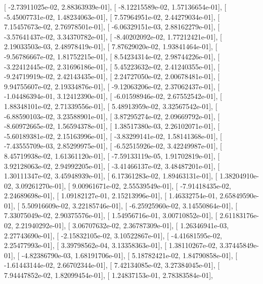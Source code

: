\documentclass{article}
\begin{document}
       [ -2.73911025e-02,   2.88363939e-01],
       [ -8.12215589e-02,   1.57136654e-01],
       [ -5.45007731e-02,   1.48234063e-01],
       [  7.57964951e-02,   2.44279034e-01],
       [  7.15457673e-02,   2.76978501e-01],
       [ -6.06329151e-03,   2.88162279e-01],
       [ -3.57641437e-02,   3.34370782e-01],
       [ -8.40202092e-02,   1.77212421e-01],
       [  2.19033503e-03,   2.48978419e-01],
       [  7.87629020e-02,   1.93841464e-01],
       [ -9.56786667e-02,   1.81752215e-01],
       [  8.54234314e-02,   2.98744226e-01],
       [ -3.22412445e-02,   2.31696186e-01],
       [  5.45223632e-02,   2.41240355e-01],
       [ -9.24719919e-02,   2.42143435e-01],
       [  2.24727050e-02,   2.00678481e-01],
       [  9.94755607e-02,   2.19334876e-01],
       [ -9.12063206e-02,   2.37062437e-01],
       [ -1.04486394e-01,   3.12412390e-01],
       [ -6.01598946e-02,   2.67552542e-01],
       [  1.88348101e-02,   2.71339556e-01],
       [  5.48913959e-02,   3.32567542e-01],
       [ -6.88590103e-02,   3.23588901e-01],
       [  3.87295274e-02,   2.09669792e-01],
       [ -8.60972665e-02,   1.56594378e-01],
       [  1.38517380e-03,   2.26102071e-01],
       [ -5.60189381e-02,   2.15163996e-01],
       [ -3.83299141e-02,   1.58141368e-01],
       [ -7.43555709e-03,   2.85299975e-01],
       [ -6.52515926e-02,   3.42249987e-01],
       [  8.45719938e-02,   1.61361120e-01],
       [ -7.59133119e-05,   1.91702819e-01],
       [  3.92128063e-02,   2.94992205e-01],
       [ -3.41466137e-02,   3.48487201e-01],
       [  1.30111347e-02,   3.45948939e-01],
       [  6.17361283e-02,   1.89463131e-01],
       [  1.38204910e-02,   3.09261270e-01],
       [  9.00961671e-02,   2.55539549e-01],
       [ -7.91418435e-02,   2.24689698e-01],
       [  1.09182127e-01,   2.15213996e-01],
       [  1.46332754e-01,   2.65849590e-01],
       [  5.50916609e-02,   3.22185746e-01],
       [ -6.25925960e-02,   3.14550864e-01],
       [  7.33075049e-02,   2.90375576e-01],
       [  1.54956716e-01,   3.00710852e-01],
       [  2.61183176e-02,   2.21940292e-01],
       [  3.06707632e-02,   2.36787309e-01],
       [  1.26346941e-03,   2.27743690e-01],
       [ -2.15832105e-02,   3.10522867e-01],
       [ -4.41681595e-02,   2.25477993e-01],
       [  3.39798562e-04,   3.13358363e-01],
       [  1.38110267e-02,   3.37445849e-01],
       [ -4.82386790e-03,   1.68191706e-01],
       [  5.18782421e-02,   1.84790858e-01],
       [ -1.61443144e-02,   2.66702344e-01],
       [  7.42134085e-02,   3.27384045e-01],
       [  7.94447852e-02,   1.82099454e-01],
       [  1.24837153e-01,   2.78383584e-01],
\end{document}
